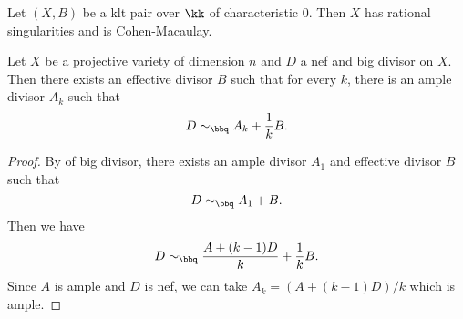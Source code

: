     \begin{lemma}\label{lem: klt pair has rational singularities and is Cohen-Macaulay}
        Let \((X,B)\) be a klt pair over \(\kk\) of characteristic \(0\).
        Then \(X\) has rational singularities and is Cohen-Macaulay.
    \end{lemma}

    \begin{lemma}\label{lem:nef_and_big_approximation_by_ample}
        Let \(X\) be a projective variety of dimension \(n\) and \(D\) a nef and big divisor on \(X\).
        Then there exists an effective divisor \(B\) such that for every \(k\), there is an ample divisor \(A_k\) such that 
        \[ D \sim_\bbq A_k + \frac{1}{k}B. \]
    \end{lemma}
    \begin{proof}
        By  of big divisor, there exists an ample divisor \(A_1\) and effective divisor \(B\) such that
        \[ D \sim_\bbq A_1 + B. \]
        Then we have 
        \[ D \sim_\bbq \frac{A + (k-1)D}{k} + \frac{1}{k}B. \]
        Since \(A\) is ample and \(D\) is nef, we can take \(A_k = (A + (k-1)D)/k\) which is ample.
    \end{proof}
 
    

